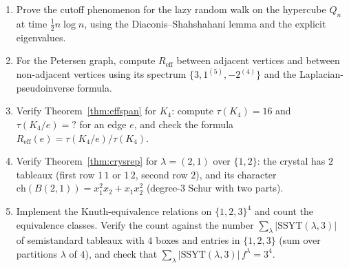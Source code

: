 \begin{enumerate}[resume]
\item Prove the cutoff phenomenon for the lazy random walk on the hypercube
$Q_n$ at time $\tfrac{1}{2} n \log n$, using the Diaconis--Shahshahani
lemma and the explicit eigenvalues.

\item For the Petersen graph, compute $R_{\mathrm{eff}}$ between adjacent
vertices and between non-adjacent vertices using its spectrum
$\{3, 1^{(5)}, -2^{(4)}\}$ and the Laplacian-pseudoinverse formula.

\item Verify Theorem~\ref{thm:effspan} for $K_4$: compute $\tau(K_4) = 16$
and $\tau(K_4 / e) = ?$ for an edge $e$, and check the formula
$R_{\mathrm{eff}}(e) = \tau(K_4 / e) / \tau(K_4)$.

\item Verify Theorem~\ref{thm:crysrep} for $\lambda = (2, 1)$ over $\{1, 2\}$:
the crystal has $2$ tableaux (first row $1\,1$ or $1\,2$, second row
$2$), and its character
$\mathrm{ch}(B(2, 1)) = x_1^2 x_2 + x_1 x_2^2$ (degree-$3$ Schur with
two parts).

\item Implement the Knuth-equivalence relations on $\{1, 2, 3\}^4$ and count
the equivalence classes. Verify the count against the number
$\sum_\lambda |\mathrm{SSYT}(\lambda, 3)|$ of semistandard tableaux with
$4$ boxes and entries in $\{1, 2, 3\}$ (sum over partitions $\lambda$ of
$4$), and check that $\sum_\lambda |\mathrm{SSYT}(\lambda, 3)|\, f^\lambda = 3^4$.
\end{enumerate}

